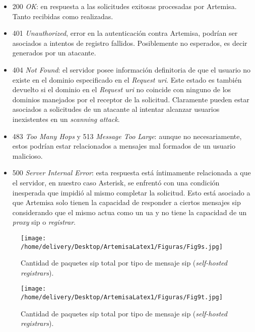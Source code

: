 \documentclass[a4paper,12pt]{report}
\begin{document}
{\begin{itemize}
\item 200 \emph{OK}: en respuesta a las solicitudes exitosas procesadas por
Artemisa. Tanto recibidas como realizadas.

\item 401 \emph{Unauthorized}, error en la autenticación contra Artemisa,
podrían ser asociados a intentos de registro fallidos. Posiblemente no
esperados, es decir generados por un atacante.

\item 404 \emph{Not Found}: el servidor posee información definitoria de que el
usuario no existe en el dominio especificado en el \emph{Request \ac{uri}}. Este
estado es también devuelto si el dominio en el \emph{Request \ac{uri}} no coincide
con ninguno de los dominios manejados por el receptor de la solicitud.
Claramente pueden estar asociados a solicitudes de un atacante al intentar
alcanzar usuarios inexistentes en un \emph{scanning attack}.

\item 483 \emph{Too Many Hops} y 513 \emph{Message Too Large}: aunque no
necesariamente, estos podrían estar relacionados a mensajes mal formados de un
usuario malicioso.

\item 500 \emph{Server Internal Error}: esta respuesta está íntimamente
relacionada a que el servidor, en nuestro caso Asterisk, se enfrentó con una
condición inesperada que impidió al mismo completar la solicitud. Esto está
asociado a que Artemisa solo tienen la capacidad de responder a ciertos
mensajes \ac{sip} considerando que el mismo actua como un \ac{ua} y no tiene la
capacidad de un \emph{proxy} \ac{sip} o \emph{registrar}.
\end{itemize}

\begin{figure}[h!] 
\centering
\texttt{[image: /home/delivery/Desktop/ArtemisaLatex1/Figuras/Fig9s.jpg]}
\caption{Cantidad de paquetes \ac{sip} total por tipo de mensaje \ac{sip}
(\emph{self-hosted} \emph{registrars}).}
\label{cant_paq_sip_x_mje_sip_barras}
\end{figure}

\begin{figure}[h!] 
\centering
\texttt{[image: /home/delivery/Desktop/ArtemisaLatex1/Figuras/Fig9t.jpg]}
\caption{Cantidad de paquetes \ac{sip} total por tipo de mensaje \ac{sip}
(\emph{self-hosted} \emph{registrars}).}
\label{cant_paq_sip_x_mje_sip_torta}
\end{figure}

}
\end{document}
